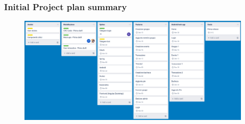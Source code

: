\documentclass[11pt]{beamer}
\begin{document}
	\begin{frame}
		\frametitle{Initial Project plan summary}
		
		\begin{figure}
			\centering
			\includegraphics[width=\linewidth]{trello}
		\end{figure}
		

\end{frame}
\end{document}

